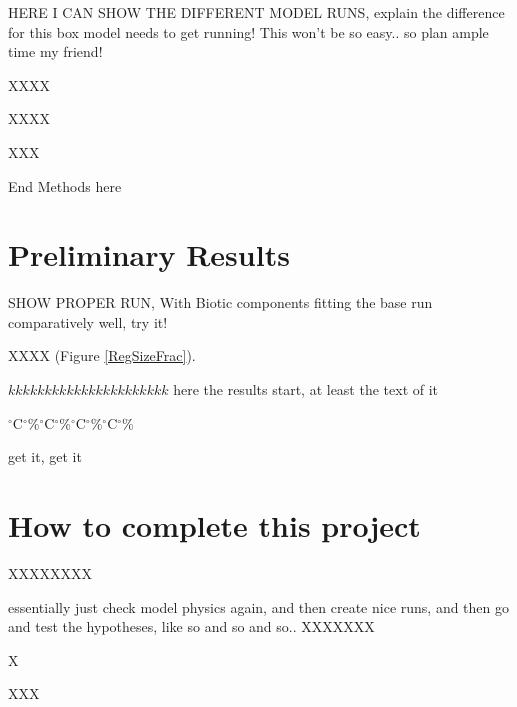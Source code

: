 HERE I CAN SHOW THE DIFFERENT MODEL RUNS, explain the difference
for this box model needs to get running! This won't be so easy.. so plan ample time my friend!

XXXX

XXXX

XXX


End Methods here

\section{Preliminary Results}


SHOW PROPER RUN, With Biotic components fitting the base run comparatively well, try it!

XXXX (Figure \ref{RegSizeFrac}).



$kkkkkkkkkkkkkkkkkkkkkk$ here the results start, at least the text of it

$^{\circ}$C$^{\circ}$\%$^{\circ}$C$^{\circ}$\%$^{\circ}$C$^{\circ}$\%$^{\circ}$C$^{\circ}$\%


get it, get it


\section{How to complete this project}
XXXXXXXX

essentially just check model physics again, and then
create nice runs, and then go and test the hypotheses, like so and so and so..
XXXXXXX

X

XXX


